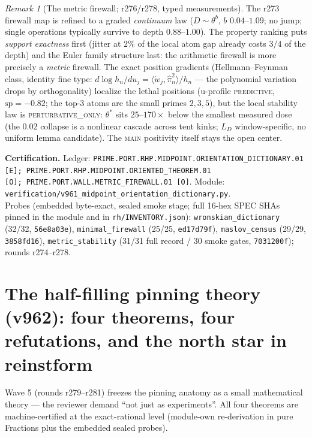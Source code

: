 \documentclass[11pt]{article}
\newcommand{\certbox}[3]{%
  \par\medskip\noindent\colorbox{certgray}{\parbox{\dimexpr\linewidth-2\fboxsep}{%
    \footnotesize\raggedright\textbf{Certification.} Ledger: \texttt{#1}.\quad
    Module: \texttt{#2}.\\ #3}}\par\medskip}
\theoremstyle{definition}
\theoremstyle{remark}
\newtheorem{remark}[theorem]{Remark}
\begin{document}
\begin{remark}[The metric firewall; r276/r278, typed measurements]
The r273 firewall map is refined to a graded \emph{continuum} law
($D\sim\theta^b$, $b$ $0.04$--$1.09$; no jump; single operations
typically survive to depth $0.88$--$1.00$).  The property ranking puts
\emph{support exactness} first (jitter at $2\%$ of the local atom gap
already costs $3/4$ of the depth) and the Euler family structure last:
the arithmetic firewall is more precisely a \emph{metric} firewall.  The
exact position gradients (Hellmann--Feynman class, identity fine type:
$d\log h_n/du_j=\langle\dot w_j,\hat\pi_n^2\rangle/h_n$ --- the
polynomial variation drops by orthogonality) localize the lethal
positions (u-profile \textsc{predictive}, $\mathrm{sp}=-0.82$; the top-3
atoms are the small primes $2,3,5$), but the local stability law is
\textsc{perturbative\_only}: $\theta^*$ sits $25$--$170\times$ below the
smallest measured dose (the $0.02$ collapse is a nonlinear cascade
across tent kinks; $L_D$ window-specific, no uniform lemma candidate).
The \textsc{main} positivity itself stays the open center.
\end{remark}

\certbox{PRIME.PORT.RHP.MIDPOINT.ORIENTATION\_DICTIONARY.01 [E];\
PRIME.PORT.RHP.MIDPOINT.ORIENTED\_THEOREM.01 [O];\
PRIME.PORT.WALL.METRIC\_FIREWALL.01 [O]}%
{verification/v961\_midpoint\_orientation\_dictionary.py}%
{Probes (embedded byte-exact, sealed smoke stage; full 16-hex SPEC SHAs
pinned in the module and in \texttt{rh/INVENTORY.json}):
\texttt{wronskian\_dictionary} (32/32, \texttt{56e8a03e}),
\texttt{minimal\_firewall} (25/25, \texttt{ed17d79f}),
\texttt{maslov\_census} (29/29, \texttt{3858fd16}),
\texttt{metric\_stability} (31/31 full record / 30 smoke gates,
\texttt{7031200f}); rounds r274--r278.}

\section{The half-filling pinning theory (v962): four theorems, four
refutations, and the north star in reinstform}\label{sec:pinning}

Wave 5 (rounds r279--r281) freezes the pinning anatomy as a small
mathematical theory --- the reviewer demand ``not just as
experiments''.  All four theorems are machine-certified at the
exact-rational level (module-own re-derivation in pure Fractions plus
the embedded sealed probes).
\end{document}
